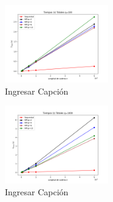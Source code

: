 \begin{figure}[H]
    \centerline{
        \includegraphics[width=0.4\textwidth]{graficos/tiempos_totales_q100.png}
    }
    \caption{Ingresar Capción}
    \label{grafico:tiempos_totales_q100}
\end{figure}
\begin{figure}[H]
    \centerline{
        \includegraphics[width=0.4\textwidth]{graficos/tiempos_totales_q1000.png}
    }
    \caption{Ingresar Capción}
    \label{grafico:tiempos_totales_q1000}
\end{figure}
